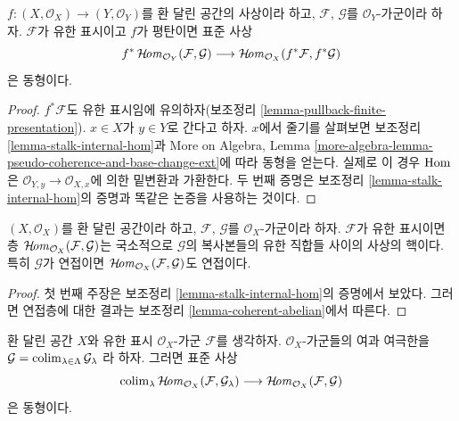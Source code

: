 \begin{lemma}
\label{lemma-pullback-internal-hom}
$f : (X, \mathcal{O}_X) \to (Y, \mathcal{O}_Y)$를 환 달린 공간의
사상이라 하고, $\mathcal{F}$, $\mathcal{G}$를 $\mathcal{O}_Y$-가군이라 하자.
$\mathcal{F}$가 유한 표시이고 $f$가 평탄이면 표준 사상
$$
f^*\mathop{\mathcal{H}\!\mathit{om}}\nolimits_{\mathcal{O}_Y}(\mathcal{F}, \mathcal{G})
\longrightarrow
\mathop{\mathcal{H}\!\mathit{om}}\nolimits_{\mathcal{O}_X}(f^*\mathcal{F}, f^*\mathcal{G})
$$
은 동형이다.
\end{lemma}

\begin{proof}
$f^*\mathcal{F}$도 유한 표시임에 유의하자(보조정리
\ref{lemma-pullback-finite-presentation}). $x \in X$가 $y \in Y$로
간다고 하자. $x$에서 줄기를 살펴보면 보조정리
\ref{lemma-stalk-internal-hom}과 More on Algebra, Lemma
\ref{more-algebra-lemma-pseudo-coherence-and-base-change-ext}에 따라
동형을 얻는다. 실제로 이 경우 $\mathop{\mathrm{Hom}}\nolimits$은
$\mathcal{O}_{Y, y} \to \mathcal{O}_{X, x}$에 의한 밑변환과 가환한다.
두 번째 증명은 보조정리 \ref{lemma-stalk-internal-hom}의 증명과
똑같은 논증을 사용하는 것이다.
\end{proof}

\begin{lemma}
\label{lemma-internal-hom-locally-kernel-direct-sum}
$(X, \mathcal{O}_X)$를 환 달린 공간이라 하고,
$\mathcal{F}$, $\mathcal{G}$를 $\mathcal{O}_X$-가군이라 하자.
$\mathcal{F}$가 유한 표시이면 층
$\mathop{\mathcal{H}\!\mathit{om}}\nolimits_{\mathcal{O}_X}(\mathcal{F}, \mathcal{G})$는 국소적으로
$\mathcal{G}$의 복사본들의 유한 직합들 사이의 사상의 핵이다.
특히 $\mathcal{G}$가 연접이면
$\mathop{\mathcal{H}\!\mathit{om}}\nolimits_{\mathcal{O}_X}(\mathcal{F}, \mathcal{G})$도 연접이다.
\end{lemma}

\begin{proof}
첫 번째 주장은 보조정리 \ref{lemma-stalk-internal-hom}의 증명에서 보았다.
그러면 연접층에 대한 결과는 보조정리 \ref{lemma-coherent-abelian}에서 따른다.
\end{proof}

\begin{lemma}
\label{lemma-hom-finite-presentation-colimit}
환 달린 공간 $X$와 유한 표시 $\mathcal{O}_X$-가군 $\mathcal{F}$를 생각하자.
$\mathcal{O}_X$-가군들의 여과 여극한을
$\mathcal{G} = \mathop{\mathrm{colim}}\nolimits_{\lambda \in \Lambda} \mathcal{G}_\lambda$
라 하자. 그러면 표준 사상
$$
\mathop{\mathrm{colim}}\nolimits_\lambda \mathop{\mathcal{H}\!\mathit{om}}\nolimits_{\mathcal{O}_X}(\mathcal{F}, \mathcal{G}_\lambda)
\longrightarrow
\mathop{\mathcal{H}\!\mathit{om}}\nolimits_{\mathcal{O}_X}(\mathcal{F}, \mathcal{G})
$$
은 동형이다.
\end{lemma}

